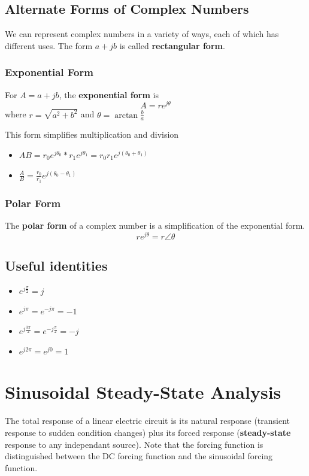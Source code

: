 \documentclass[12pt]{article}
\begin{document}
\subsection*{Alternate Forms of Complex Numbers}
We can represent complex numbers in a variety of ways, each of which has different uses. The form $a + jb$ is called {\bf rectangular form}.

\subsubsection*{Exponential Form}
For $A = a + jb$, the {\bf exponential form} is \[ A = re^{j\theta} \] where $r = \sqrt{a^2 + b^2}$ and $\theta = \arctan\frac{b}{a}$

This form simplifies multiplication and division
\begin{itemize}
\item $AB = r_0e^{j\theta_0} * r_1e^{j\theta_1} = r_0r_1e^{j(\theta_0+\theta_1)}$
\item $\frac{A}{B} = \frac{r_0}{r_1}e^{j(\theta_0-\theta_1)}$
\end{itemize}

\subsubsection*{Polar Form}
The {\bf polar form} of a complex number is a simplification of the exponential form. \[ re^{j\theta} = r\angle\theta \]

\subsection{Useful identities}
\begin{itemize}
\item $e^{j\frac{\pi}{2}} = j$
\item $e^{j\pi} = e^{-j\pi} = -1$
\item $e^{j\frac{3\pi}{2}} = e^{-j\frac{\pi}{2}} = -j$
\item $e^{j2\pi} = e^{j0} = 1$
\end{itemize}

\section*{Sinusoidal Steady-State Analysis}
The total response of a linear electric circuit is its natural response (transient response to sudden condition changes) plus its forced response ({\bf steady-state} response to any independant source). Note that the forcing function is distinguished between the DC forcing function and the sinusoidal forcing function.
\end{document}
